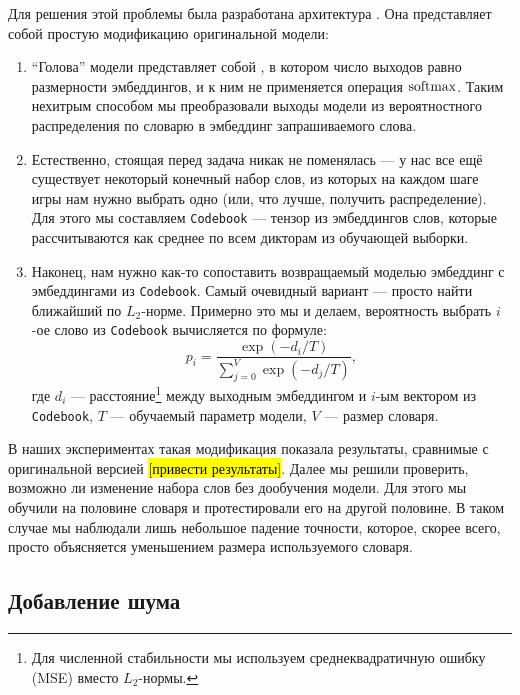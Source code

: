 Для решения этой проблемы была разработана архитектура \cbenquirer{}. Она
представляет собой простую модификацию оригинальной модели:
\begin{enumerate}
    \item ``Голова'' модели представляет собой \enquirer{}, в котором число
    выходов равно размерности эмбеддингов, и к ним не применяется операция
    $\operatorname{\text{softmax}}$. Таким нехитрым способом мы преобразовали выходы модели из
    вероятностного распределения по словарю в эмбеддинг запрашиваемого слова.
    \item Естественно, стоящая перед \cbenquirer{} задача никак не поменялась ---
    у нас все ещё существует некоторый конечный набор слов, из которых на
    каждом шаге игры нам нужно выбрать одно (или, что лучше, получить
    распределение). Для этого мы составляем \texttt{Codebook} --- тензор из
    эмбеддингов слов, которые рассчитываются как среднее по всем дикторам из
    обучающей выборки.
    \item Наконец, нам нужно как-то сопоставить возвращаемый моделью эмбеддинг
    с эмбеддингами из \texttt{Codebook}. Самый очевидный вариант --- просто
    найти ближайший по $L_2$-норме. Примерно это мы и делаем, вероятность
    выбрать $i$-ое слово из \texttt{Codebook} вычисляется по формуле:
    \begin{equation*}
        p_i = \frac{\exp{(-d_i/T)}}{\sum_{j=0}^{V}{\exp{(-d_j/T)}}},
    \end{equation*}
    где $d_i$ --- расстояние\footnote{
        Для численной стабильности мы используем среднеквадратичную ошибку (MSE)
        вместо $L_2$-нормы.
    } между выходным эмбеддингом и $i$-ым вектором из \texttt{Codebook}, $T$ ---
    обучаемый параметр модели, $V$ --- размер словаря.
\end{enumerate}

В наших экспериментах такая модификация показала результаты, сравнимые с
оригинальной версией \enquirer{} \hl{[привести результаты]}. Далее мы решили
проверить, возможно ли изменение набора слов без дообучения модели. Для этого
мы обучили \cbenquirer{} на половине словаря и протестировали его на другой
половине. В таком случае мы наблюдали лишь небольшое падение точности, которое,
скорее всего, просто объясняется уменьшением размера используемого словаря.

\subsection{Добавление шума}

